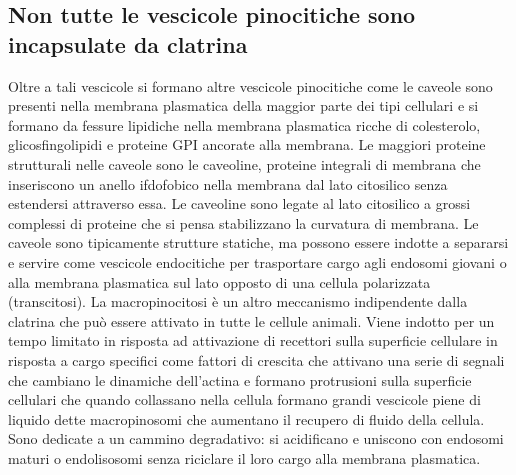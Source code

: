 \subsection{Non tutte le vescicole pinocitiche sono incapsulate da clatrina}
Oltre a tali vescicole si formano altre vescicole pinocitiche come le caveole sono presenti nella membrana plasmatica della maggior parte dei tipi cellulari e si formano da fessure
lipidiche nella membrana plasmatica ricche di colesterolo, glicosfingolipidi e proteine GPI ancorate alla membrana. Le maggiori proteine strutturali nelle caveole sono le caveoline, 
proteine integrali di membrana che inseriscono un anello ifdofobico nella membrana dal lato citosilico senza estendersi attraverso essa. Le caveoline sono legate al lato citosilico
a grossi complessi di proteine che si pensa stabilizzano la curvatura di membrana. Le caveole sono tipicamente strutture statiche, ma possono essere indotte a separarsi e servire come
vescicole endocitiche per trasportare cargo agli endosomi giovani o alla membrana plasmatica sul lato opposto di una cellula polarizzata (transcitosi). La macropinocitosi \`e un
altro meccanismo indipendente dalla clatrina che pu\`o essere attivato in tutte le cellule animali. Viene indotto per un tempo limitato in risposta ad attivazione di recettori sulla
superficie cellulare in risposta a cargo specifici come fattori di crescita che attivano una serie di segnali che cambiano le dinamiche dell'actina e formano protrusioni sulla
superficie cellulari che quando collassano nella cellula formano grandi vescicole piene di liquido dette macropinosomi che aumentano il recupero di fluido della cellula. Sono dedicate a
un cammino degradativo: si acidificano e uniscono con endosomi maturi o endolisosomi senza riciclare il loro cargo alla membrana plasmatica.
